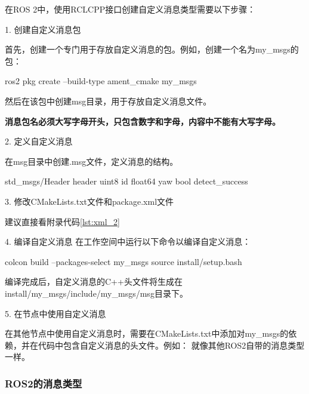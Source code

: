 在ROS 2中，使用RCLCPP接口创建自定义消息类型需要以下步骤：

1. 创建自定义消息包

首先，创建一个专门用于存放自定义消息的包。例如，创建一个名为my\_msgs的包：
\begin{tbash}
    ros2 pkg create --build-type ament_cmake my_msgs
\end{tbash}

然后在该包中创建msg目录，用于存放自定义消息文件。

\textbf{消息包名必须大写字母开头，只包含数字和字母，内容中不能有大写字母。}

2. 定义自定义消息

在msg目录中创建.msg文件，定义消息的结构。
\begin{tbash}
    std_msgs/Header header
    uint8 id
    float64 yaw
    bool detect_success
\end{tbash}

3. 修改CMakeLists.txt文件和package.xml文件

建议直接看附录代码\ref{lst:xml_2}

4. 编译自定义消息
在工作空间中运行以下命令以编译自定义消息：
\begin{tbash}
    colcon build --packages-select my_msgs
    source install/setup.bash
\end{tbash}

编译完成后，自定义消息的C++头文件将生成在install/my\_msgs/include/my\_msgs/msg目录下。

5. 在节点中使用自定义消息

在其他节点中使用自定义消息时，需要在CMakeLists.txt中添加对my\_msgs的依赖，并在代码中包含自定义消息的头文件。例如：
就像其他ROS2自带的消息类型一样。

\subsubsection{ROS2的消息类型}

